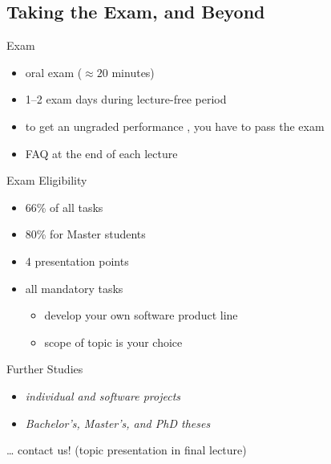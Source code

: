 \subsection{Taking the Exam, and Beyond}

\begin{frame}[label=Exam]{\myframetitle}
	\begin{fancycolumns}
		\begin{definition}{Exam}
			\begin{itemize}
				\item oral exam ($\approx 20$ minutes)
				\item 1--2 exam days during lecture-free period
				\item to get an ungraded performance , you have to pass the exam
				\item FAQ at the end of each lecture
			\end{itemize}
		\end{definition}
		\begin{definition}{Exam Eligibility }
			\begin{itemize}
				\item 66\% of all tasks 
				\item 80\% for Master students
				\item 4 presentation points 
				\item all mandatory tasks
				\begin{itemize}
					\item develop your own software product line
					\item scope of topic is your choice
				\end{itemize}
			\end{itemize}
		\end{definition}
	\nextcolumn
		\begin{note}{Further Studies}
			\begin{itemize}
				\item \emph{individual and software projects}
				\item \emph{Bachelor's, Master's, and PhD theses}
			\end{itemize}
			\ldots{} contact us! (topic presentation in final lecture)
		\end{note}
	\end{fancycolumns}
\end{frame}
